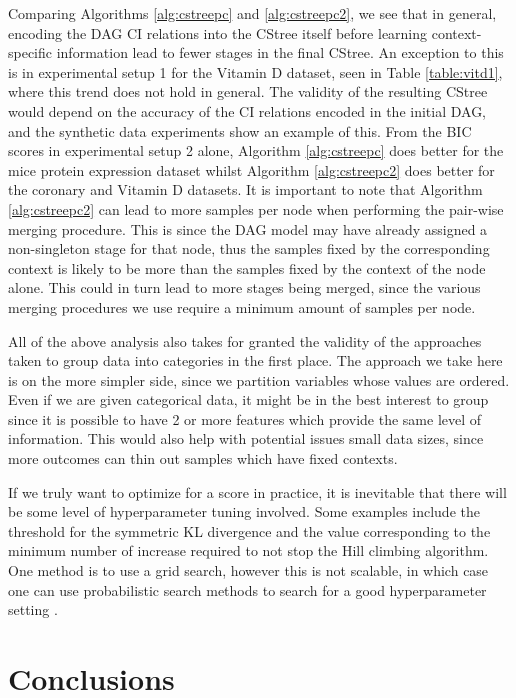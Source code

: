 \documentclass{tufte-book}
\begin{document}
Comparing Algorithms \ref{alg:cstreepc} and \ref{alg:cstreepc2}, we see that in general, encoding the DAG CI relations into the CStree itself before learning context-specific information lead to fewer stages in the final CStree. An exception to this is in experimental setup 1 for the Vitamin D dataset, seen in Table \ref{table:vitd1}, where this trend does not hold in general. The validity of the resulting CStree would depend on the accuracy of the CI relations encoded in the initial DAG, and the synthetic data experiments show an example of this. From the BIC scores in experimental setup 2 alone, Algorithm \ref{alg:cstreepc} does better for the mice protein expression dataset whilst Algorithm \ref{alg:cstreepc2} does better for the coronary and Vitamin D datasets.  It is important to note that Algorithm \ref{alg:cstreepc2} can lead to more samples per node when performing the pair-wise merging procedure. This is since the DAG model may have already assigned a non-singleton stage for that node, thus the samples fixed by the corresponding context is likely to be more than the samples fixed by the context of the node alone. This could in turn lead to more stages being merged, since the various merging procedures we use require a minimum amount of samples per node.


All of the above analysis also takes for granted the validity of the approaches taken to group data into categories in the first place. The approach we take here is on the more simpler side, since we partition variables whose values are ordered. Even if we are given categorical data, it might be in the best interest to group since it is possible to have 2 or more features which provide the same level of information. This would also help with potential issues small data sizes, since more outcomes can thin out samples which have fixed contexts.


If we truly want to optimize for a score in practice, it is inevitable that there will be some level of hyperparameter tuning involved. Some examples include the threshold for the symmetric KL divergence and the value corresponding to the minimum number of increase required to not stop the Hill climbing algorithm. One method is to use a grid search, however this is not scalable, in which case one can use probabilistic search methods to search for a good hyperparameter setting \cite{oh-2019-combin-bayes}.


\chapter{Conclusions}
\label{sec:orgf5bdef1}
\end{document}
